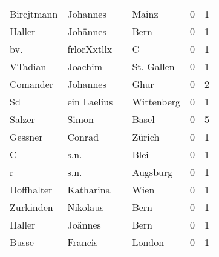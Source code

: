 \begin{tabular}{llllrr}
               Bircjtmann &                           Johannes &             &                                       Mainz &          0 &         1 \\
                   Haller &                           Johännes &             &                                        Bern &          0 &         1 \\
                      bv. &                        frlorXxtllx &             &                                           C &          0 &         1 \\
                  VTadian &                            Joachim &             &                                  St. Gallen &          0 &         1 \\
                 Comander &                           Johannes &             &                                        Ghur &          0 &         2 \\
                       Sd &                        ein Laelius &             &                                  Wittenberg &          0 &         1 \\
                   Salzer &                              Simon &             &                                       Basel &          0 &         5 \\
                  Gessner &                             Conrad &             &                                      Zürich &          0 &         1 \\
                        C &                               s.n. &             &                                        Blei &          0 &         1 \\
                        r &                               s.n. &             &                                    Augsburg &          0 &         1 \\
               Hoffhalter &                          Katharina &             &                                        Wien &          0 &         1 \\
                Zurkinden &                           Nikolaus &             &                                        Bern &          0 &         1 \\
                   Haller &                            Joännes &             &                                        Bern &          0 &         1 \\
                    Busse &                            Francis &             &                                      London &          0 &         1 \\

\end{tabular}
